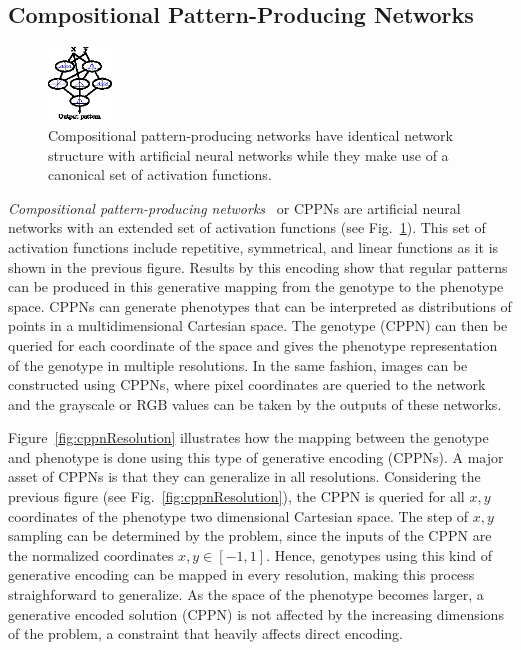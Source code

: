 \documentclass{sig-alternate}
\begin{document}
\subsection{Compositional Pattern-Producing Networks}

\begin{figure}[b!]
\centering
\includegraphics[width=0.15\textwidth]{../Figures/Misc/cppnNetwork.eps}
\caption{Compositional pattern-producing networks have identical network structure with artificial neural networks while they make use of a canonical set of activation functions.}
\label{fig:cppnNetwork}
\end{figure}

\emph{Compositional pattern-producing networks}~\cite{stanley2007compositional} or CPPNs are artificial neural networks with an extended set of activation functions (see Fig.~\ref{fig:cppnNetwork}). This set of activation functions include repetitive, symmetrical, and linear functions as it is shown in the previous figure. Results by this encoding show that regular patterns can be produced in this generative mapping from the genotype to the phenotype space. CPPNs can generate phenotypes that can be interpreted as distributions of points in a multidimensional Cartesian space. The genotype (CPPN) can then be queried for each coordinate of the space and gives the phenotype representation of the genotype in multiple resolutions. In the same fashion, images can be constructed using CPPNs, where pixel coordinates are queried to the network and the grayscale or RGB values can be taken by the outputs of these networks. 

Figure~\ref{fig:cppnResolution} illustrates how the mapping between the genotype and phenotype is done using this type of generative encoding (CPPNs). A major asset of CPPNs is that they can generalize in all resolutions. Considering the previous figure (see Fig.~\ref{fig:cppnResolution}), the CPPN is queried for all $x,y$ coordinates of the phenotype two dimensional Cartesian space. The step of $x,y$ sampling can be determined by the problem, since the inputs of the CPPN are the normalized coordinates $x,y \in [-1,1]$. Hence, genotypes using this kind of generative encoding can be mapped in every resolution, making this process straighforward to generalize. As the space of the phenotype becomes larger, a generative encoded solution (CPPN) is not affected by the increasing dimensions of the problem, a constraint that heavily affects direct encoding.
\end{document}
